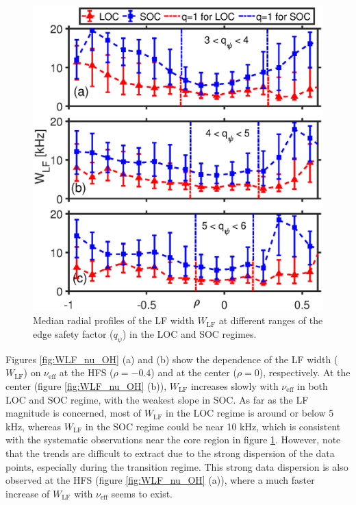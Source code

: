 \begin{figure}[h]
\begin{centering}
\includegraphics[scale=0.67]{fig_WLF_LOCSOC.eps}
\par\end{centering}
\caption{Median radial profiles of the LF width $W_\mathrm{LF}$ at different ranges of the edge safety factor ($q_{\psi}$) in the LOC and SOC regimes.}
\label{fig:WLF_r_OH}
\end{figure}


Figures \ref{fig:WLF_nu_OH} (a) and (b) show the dependence of the LF width ($W_\mathrm{LF}$) on $\nu_\mathrm{eff}$ at the HFS ($\rho = -0.4$) and at the center ($\rho = 0$), respectively. At the center (figure \ref{fig:WLF_nu_OH} (b)), $W_\mathrm{LF}$ increases slowly with $\nu_\mathrm{eff}$ in both LOC and SOC regime, with the weakest slope in SOC. As far as the LF magnitude is concerned, most of $W_\mathrm{LF}$ in the LOC regime is around or below 5 kHz, whereas $W_\mathrm{LF}$ in the SOC regime could be near 10 kHz, which is consistent with the systematic observations near the core region in figure \ref{fig:WLF_r_OH}. However, note that the trends are difficult to extract due to the strong dispersion of the data points, especially during the transition regime. This strong data dispersion is also observed at the HFS (figure \ref{fig:WLF_nu_OH} (a)), where a much faster increase of $W_\mathrm{LF}$ with $\nu_\mathrm{eff}$ seems to exist.

